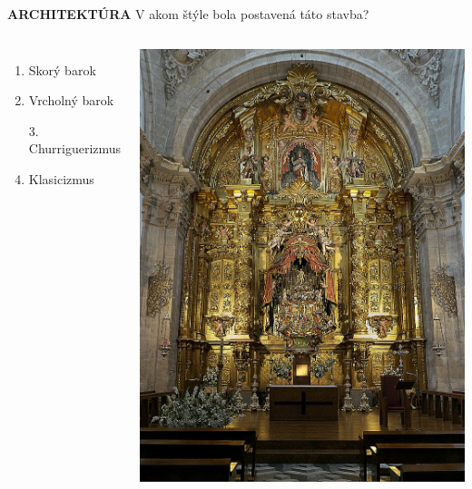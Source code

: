 \documentclass[dvipsnames]{beamer}
\begin{document}
\begin{frame}
	\textbf{ARCHITEKTÚRA}
	\vskip 3mm
	V akom štýle bola postavená táto stavba?
	\begin{columns}
	\begin{enumerate}
		\item Skorý barok
		\item Vrcholný barok
		\item [\textcolor{g}{3.}] \textcolor{g}{Churriguerizmus}\setcounter{enumi}{3}
		\item Klasicizmus
	\end{enumerate}
		\includegraphics[scale=0.2]{ultra}

	\end{columns}
\end{frame}
\end{document}
